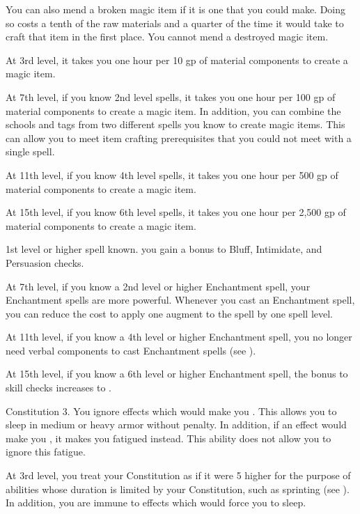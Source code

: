     You can also mend a broken magic item if it is one that you could make.
    Doing so costs a tenth of the raw materials and a quarter of the time it would take to craft that item in the first place.
    You cannot mend a destroyed magic item.

    At 3rd level, it takes you one hour per 10 gp of material components to create a magic item. %

    At 7th level, if you know 2nd level spells, it takes you one hour per 100 gp of material components to create a magic item. %
    In addition, you can combine the schools and tags from two different spells you know to create magic items.
    This can allow you to meet item crafting prerequisites that you could not meet with a single spell.

    At 11th level, if you know 4th level spells, it takes you one hour per 500 gp of material components to create a magic item. %

    At 15th level, if you know 6th level spells, it takes you one hour per 2,500 gp of material components to create a magic item. %

    \featpres 1st level or higher  spell known.
    \featben you gain a  bonus to Bluff, Intimidate, and Persuasion checks.

    At 7th level, if you know a 2nd level or higher Enchantment spell, your Enchantment spells are more powerful.
    Whenever you cast an Enchantment spell, you can reduce the cost to apply one augment to the spell by one spell level.

    At 11th level, if you know a 4th level or higher Enchantment spell, you no longer need verbal components to cast Enchantment spells (see ).

    At 15th level, if you know a 6th level or higher Enchantment spell, the bonus to skill checks increases to .

    \featpre Constitution 3.
    \featben You ignore effects which would make you \fatigued.
    This allows you to sleep in medium or heavy armor without penalty.
    In addition, if an effect would make you \exhausted, it makes you fatigued instead.
    This ability does not allow you to ignore this fatigue.

    At 3rd level, you treat your Constitution as if it were 5 higher for the purpose of abilities whose duration is limited by your Constitution, such as sprinting (see ).
    In addition, you are immune to effects which would force you to sleep.

